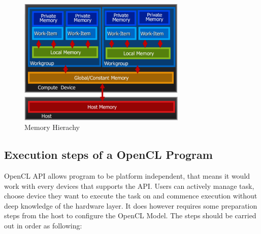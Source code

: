 \begin{figure}[H]
	\centering
	\includegraphics[width=8cm]{images/Model.png}
	\caption{Memory Hierachy}
	\label{ExampleOCTImage}
\end{figure}

\subsection{Execution steps of a OpenCL Program}
OpenCL API allows program to be platform independent, that means it would work with every devices that supports the API. Users can actively manage task, choose device they want to execute the task on and commence execution without deep knowledge of the hardware layer. It does however requires some preparation steps from the host to configure the OpenCL Model. The steps should be carried out in order as following:

